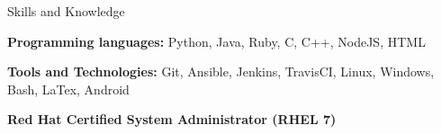 \documentclass{resume} %
\begin{document}
\begin{rSection}{Skills and Knowledge}
\vspace{-4pt}
\begin{sSubsection}
    {\textbf{Programming languages:} Python, Java, Ruby, C, C++, NodeJS, HTML}{}
\end{sSubsection}
\vspace{-5pt}

\begin{sSubsection}
    {\textbf{Tools and Technologies:} Git, Ansible, Jenkins, TravisCI, Linux, Windows, Bash, LaTex, Android}{}
\end{sSubsection}
\vspace{-5pt}

\begin{sSubsection}
    {\textbf{Red Hat Certified System Administrator (RHEL 7)}}{}
\end{sSubsection}
\end{rSection}
\end{document}
